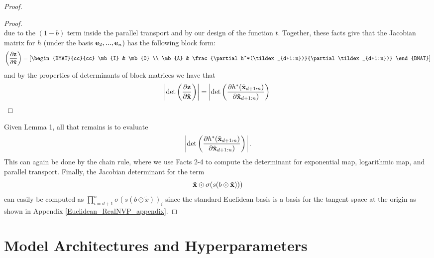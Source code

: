 \begin{proof}
\begin{proof}
\begin{equation}
\end{equation}
due to the $(1-b)$ term inside the parallel transport and by our design of the function $t$. 
Together, these facts give that the Jacobian matrix for $h$ (under the basis $\mathbf{e}_2, ..., \mathbf{e}_n$) has the following block form:
\begin{equation}
   \left(\frac{\partial \mb{z}}{\partial \tildex}\right) = \left[\begin{BMAT}{cc}{cc}
    \mb{I} & \mb{0} \\
    \mb{A} & \frac{\partial h^*(\tildex_{d+1:n})}{\partial \tildex_{d+1:n})}
    \end{BMAT}\right]
\end{equation}
and by the properties of determinants of block matrices we have that
\begin{equation}
    \left|\textnormal{det}\left(\frac{\partial \mathbf{z}}{\partial \tilde{\mathbf{x}}}\right)\right| =    \left|\textnormal{det}\left(\frac{\partial h^*(\tilde{\mathbf{x}}_{d+1:n})}{\partial \tilde{\mathbf{x}}_{d+1:n})}\right)\right|
\end{equation}
\end{proof}
Given Lemma 1, all that remains is to evaluate 
\begin{equation}
    \left|\textnormal{det}\left(\frac{\partial h^*(\tilde{\mathbf{x}}_{d+1:n})}{\partial \tilde{\mathbf{x}}_{d+1:n})}\right)\right|.
\end{equation}
This can again be done by the chain rule, where we use Facts 2-4 to compute the determinant for exponential map, logarithmic map, and parallel transport.
Finally, the Jacobian determinant for the term
\begin{equation}
    \tilde{\mathbf{x}} \odot \sigma(s(b \odot \tilde{\mathbf{x}})))
\end{equation}
can easily be computed as $\prod_{i=d+1}^n\sigma(s(b \odot \tilde{x}))_i$ since the standard Euclidean basis is a basis for the tangent space at the origin as shown in Appendix \ref{Euclidean_RealNVP_appendix}.
\end{proof}

\cut{}

\section{Model Architectures and Hyperparameters}
\label{model_arch_and_hyperparams}

